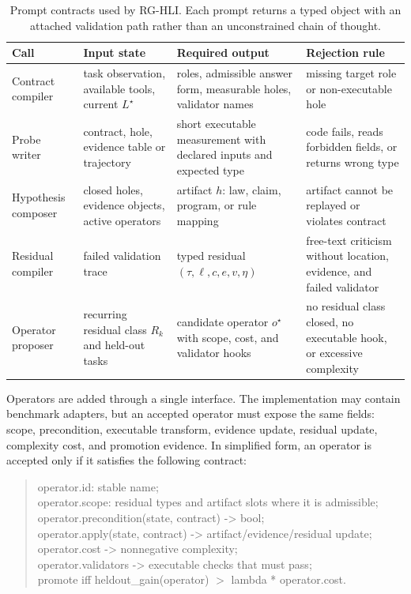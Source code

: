 \documentclass[letterpaper]{article}
\newcommand{\tblhdr}{\rowcolor{headerrow}}
\newcommand{\methodshort}{\textsc{RG-HLI}\xspace}
\begin{document}
\begin{table}[H]
\centering
\caption{Prompt contracts used by \methodshort. Each prompt returns a typed
object with an attached validation path rather than an unconstrained chain of
thought.}
\label{tab:prompt_contracts}
\small
\setlength{\tabcolsep}{4pt}
\begin{tabularx}{0.96\textwidth}{@{}lYYY@{}}
\toprule
\tblhdr
Call & Input state & Required output & Rejection rule \\
\midrule
Contract compiler & task observation, available tools, current $L^\star$ & roles, admissible answer form, measurable holes, validator names & missing target role or non-executable hole \\
Probe writer & contract, hole, evidence table or trajectory & short executable measurement with declared inputs and expected type & code fails, reads forbidden fields, or returns wrong type \\
Hypothesis composer & closed holes, evidence objects, active operators & artifact $h$: law, claim, program, or rule mapping & artifact cannot be replayed or violates contract \\
Residual compiler & failed validation trace & typed residual $(\tau,\ell,c,e,v,\eta)$ & free-text criticism without location, evidence, and failed validator \\
Operator proposer & recurring residual class $R_k$ and held-out tasks & candidate operator $o^\star$ with scope, cost, and validator hooks & no residual class closed, no executable hook, or excessive complexity \\
\bottomrule
\end{tabularx}
\end{table}

Operators are added through a single interface. The implementation may contain
benchmark adapters, but an accepted operator must expose the same fields:
scope, precondition, executable transform, evidence update, residual update,
complexity cost, and promotion evidence. In simplified form, an operator is
accepted only if it satisfies the following contract:

\begin{quote}
\footnotesize
\ttfamily
operator.id: stable name;\\
operator.scope: residual types and artifact slots where it is admissible;\\
operator.precondition(state, contract) -> bool;\\
operator.apply(state, contract) -> artifact/evidence/residual update;\\
operator.cost -> nonnegative complexity;\\
operator.validators -> executable checks that must pass;\\
promote iff heldout\_gain(operator) $>$ lambda * operator.cost.
\end{quote}
\end{document}
